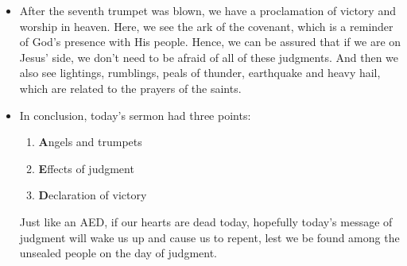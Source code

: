 \begin{itemize}
{  so great a salvation''?  We must keep watch of our soul and make sure that
  no root of bitterness springs up like Esau, so that on the day of the Lord,
  we may be found to be sealed.  }
  \item{After the seventh trumpet was blown, we have a proclamation of
  victory and worship in heaven.  Here, we see the ark of the covenant, which
  is a reminder of God's presence with His people.  Hence, we can be assured
  that if we are on Jesus' side, we don't need to be afraid of all of these
  judgments.  And then we also see lightings, rumblings, peals of thunder,
  earthquake and heavy hail, which are related to the prayers of the saints.}
  \item{In conclusion, today's sermon had three points:
  \begin{enumerate}
    \item{\textbf{A}ngels and trumpets}
    \item{\textbf{E}ffects of judgment}
    \item{\textbf{D}eclaration of victory}
  \end{enumerate}
  Just like an AED, if our hearts are dead today, hopefully today's message of judgment will wake us up and cause us to repent, lest we be found among the unsealed people on the day of judgment.}
\end{itemize}
